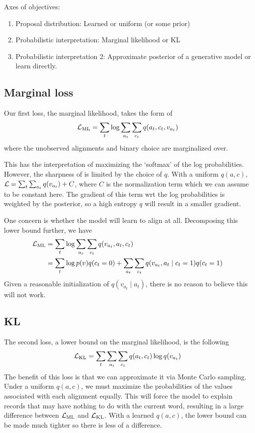 \documentclass[12pt]{article}
\begin{document}
Axes of objectives:
\begin{enumerate}
\item Proposal distribution: Learned or uniform (or some prior)
\item Probabilistic interpretation: Marginal likelihood or KL
\item Probabilistic interpretation 2: Approximate posterior
    of a generative model or learn directly.
\end{enumerate}

\subsection{Marginal loss}
Our first loss, the marginal likelihood, takes the form of
$$\mathcal{L}_{\textrm{ML}} = \sum_t \log \sum_{a_t} \sum_{c_t} q(a_t,c_t,v_{a_t})$$
where the unobserved alignments and binary choice are marginalized over.

This has the interpretation of maximizing the `softmax' of the 
log probabilities.
However, the sharpness of is limited by the choice of $q$.
With a uniform $q(a,c)$, $\mathcal{L} = \sum_t \sum_{a_t}q(v_{a_t}) + C$,
where $C$ is the normalization term which we can assume to be constant here.
The gradient of this term wrt the log probabilities is weighted by the posterior,
so a high entropy $q$ will result in a smaller gradient.

One concern is whether the model will learn to align at all.
Decomposing this lower bound further, we have
\begin{align*}
\mathcal{L}_{\textrm{ML}} &= \sum_t \log \sum_{a_t} \sum_{c_t} q(v_{a_t},a_t,c_t)\\
&= \sum_t \log p(v)q(c_t = 0) + \sum_{a_t} \sum_{c_t} q(v_{a_t},a_t\mid c_t=1)q(c_t=1)
\end{align*}
Given a reasonable initialization of $q(v_{a_t}\mid a_t)$,
there is no reason to believe this will not work.

\subsection{KL}
The second loss, a lower bound on the marginal likelihood, is the following
$$\mathcal{L}_{\textrm{KL}} = \sum_t \sum_{a_t} \sum_{c_t} q(a_t,c_t)\log q(v_{a_t})$$
The benefit of this loss is that we can approximate it via Monte Carlo sampling.
Under a uniform $q(a,c)$, we must maximize the probabilities of the values
associated with each alignment equally.
This will force the model to explain records that may have nothing to do with the current word,
resulting in a large difference between $\mathcal{L}_{\textrm{ML}}$ and $\mathcal{L}_{\textrm{KL}}$.
With a learned $q(a,c)$, the lower bound can be made much tighter so there is
less of a difference.
\end{document}

